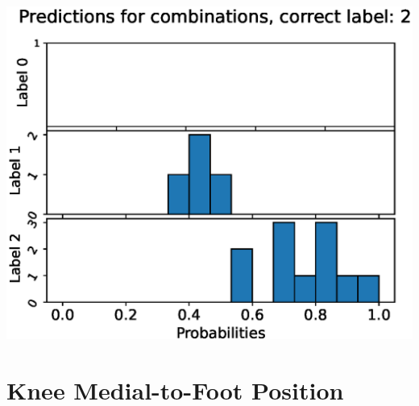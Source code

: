 \begin{center}
\begin{minipage}{0.33\textwidth}
  \includegraphics[width=\textwidth]{files/figs/app/hists/femval/pc2.eps}
\end{minipage}
\end{center}

\newpage
\section{Knee Medial-to-Foot Position}

